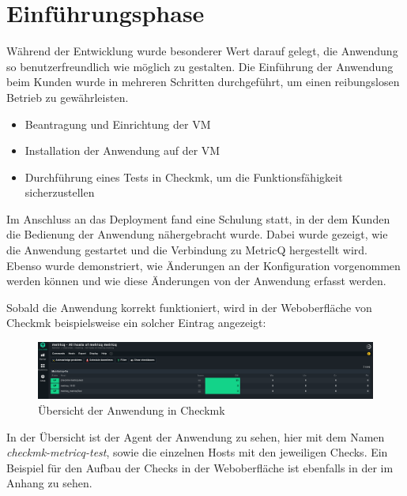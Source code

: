 \section{Einführungsphase}
Während der Entwicklung wurde besonderer Wert darauf gelegt, die Anwendung so benutzerfreundlich wie möglich zu gestalten.
Die Einführung der Anwendung beim Kunden wurde in mehreren Schritten durchgeführt, um einen reibungslosen Betrieb zu gewährleisten.

\begin{itemize}
  \item Beantragung und Einrichtung der \acrshort{VM}
  \item Installation der Anwendung auf der \acrshort{VM}
  \item Durchführung eines Tests in \Gls{Checkmk}, um die Funktionsfähigkeit sicherzustellen
\end{itemize}

\noindent
Im Anschluss an das Deployment fand eine Schulung statt, in der dem Kunden die Bedienung der Anwendung nähergebracht wurde.
Dabei wurde gezeigt, wie die Anwendung gestartet und die Verbindung zu \Gls{MetricQ} hergestellt wird.
Ebenso wurde demonstriert, wie Änderungen an der Konfiguration vorgenommen werden können und wie diese Änderungen von der Anwendung erfasst werden.

\noindent
Sobald die Anwendung korrekt funktioniert, wird in der Weboberfläche von \Gls{Checkmk} beispielsweise ein solcher Eintrag angezeigt:

\begin{figure}[H]
  \includegraphics[width=\textwidth]{images/uebersicht_checkmk.png}
  \caption{Übersicht der Anwendung in \Gls{Checkmk}}
  \label{fig:checkmk_uebersicht}
\end{figure}

\noindent
In der Übersicht ist der Agent der Anwendung zu sehen, hier mit dem Namen \textit{checkmk-metricq-test}, sowie die einzelnen Hosts mit den jeweiligen Checks.
Ein Beispiel für den Aufbau der Checks in der Weboberfläche ist ebenfalls in der  im Anhang zu sehen.
